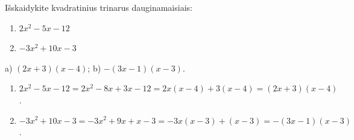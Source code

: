\begin{salyga}
Išskaidykite kvadratinius trinarus dauginamaisiais:
    \begin{enumerate}[label=\alph*), itemsep=4pt]
        \item $2x^2 - 5x - 12$
        \item $-3x^2 + 10x - 3$
    \end{enumerate}
\end{salyga}

\begin{atsakymas}
a) $(2x+3)(x-4)$; b) $-(3x-1)(x-3)$.
\end{atsakymas}

\begin{sprendimas}
\begin{enumerate}[label=\alph*)]
\item $2x^2-5x-12=2x^2-8x+3x-12=2x(x-4)+3(x-4)=(2x+3)(x-4)$.
\item $-3x^2+10x-3=-3x^2+9x+x-3=-3x(x-3)+(x-3)=-(3x-1)(x-3)$.
\end{enumerate}
\end{sprendimas}
